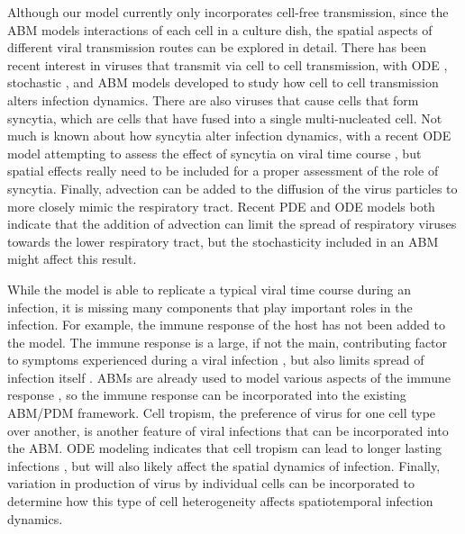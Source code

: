 Although our model currently only incorporates cell-free transmission, since the ABM models interactions of each cell in a culture dish, the spatial aspects of different viral transmission routes can be explored in detail. There has been recent interest in viruses that transmit via cell to cell transmission, with ODE \citep{allen15,komarova13,iwami15}, stochastic \citep{graw15}, and ABM \citep{kumberger18,blahut21} models developed to study how cell to cell transmission alters infection dynamics. There are also viruses that cause cells that form syncytia, which are cells that have fused into a single multi-nucleated cell. Not much is known about how syncytia alter infection dynamics, with a recent ODE model attempting to assess the effect of syncytia on viral time course \citep{jessie21}, but spatial effects really need to be included for a proper assessment of the role of syncytia. Finally, advection can be added to the diffusion of the virus particles to more closely mimic the respiratory tract. Recent PDE \citep{quirouette20} and ODE \citep{gonzalez19} models both indicate that the addition of advection can limit the spread of respiratory viruses towards the lower respiratory tract, but the stochasticity included in an ABM might affect this result. 

While the model is able to replicate a typical viral time course during an infection, it is missing many components that play important roles in the infection. For example, the immune response of the host has not been added to the model. The immune response is a large, if not the main, contributing factor to symptoms experienced during a viral infection \citep{manchanda14,zheng18}, but also limits spread of infection itself \citep{dobrovolny13}. ABMs are already used to model various aspects of the immune response \citep{whitman20,kerepesi19,levin16}, so the immune response can be incorporated into the existing ABM/PDM framework. Cell tropism, the preference of virus for one cell type over another, is another feature of viral infections that can be incorporated into the ABM. ODE modeling indicates that cell tropism can lead to longer lasting infections \citep{dobrovolny10}, but will also likely affect the spatial dynamics of infection. Finally, variation in production of virus by individual cells \citep{timm12} can be incorporated to determine how this type of cell heterogeneity affects spatiotemporal infection dynamics.


